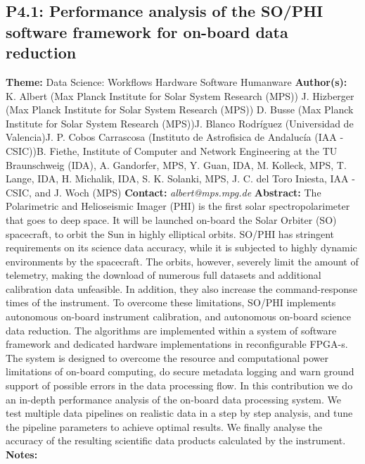 \documentclass{report}
\begin{document}
{{\subsection*{P4.1: Performance analysis of the SO/PHI software framework for on-board data reduction}
{\bf Theme:}  Data Science: Workflows Hardware Software Humanware\newline
{\bf Author(s):}\newline
K. Albert (Max Planck Institute for Solar System Research (MPS)) \newline J. Hizberger (Max Planck Institute for Solar System Research (MPS)) \newline  D. Busse (Max Planck Institute for Solar System Research (MPS))\newline  J. Blanco Rodríguez (Universidad de Valencia)\newline J. P. Cobos Carrascosa (Instituto de Astrofisica de Andalucía (IAA - CSIC))\newline  B. Fiethe, Institute of Computer and Network Engineering at the TU Braunschweig (IDA), A. Gandorfer, MPS, Y. Guan, IDA, M. Kolleck, MPS, T. Lange, IDA, H. Michalik, IDA, S. K. Solanki, MPS, J. C. del Toro Iniesta, IAA - CSIC, and J. Woch (MPS)\newline\newline
{\bf Contact:} {\it albert@mps.mpg.de}\newline
\newline\newline
{\bf Abstract:}\newline
The Polarimetric and Helioseismic Imager (PHI) is the first solar spectropolarimeter that goes to deep space. It will be launched on-board the Solar Orbiter (SO) spacecraft, to orbit the Sun in highly elliptical orbits. SO/PHI has stringent requirements on its science data accuracy, while it is subjected to highly dynamic environments by the spacecraft. The orbits, however, severely limit the amount of telemetry, making the download of numerous full datasets and additional calibration data unfeasible. In addition, they also increase the command-response times of the instrument.
To overcome these limitations, SO/PHI implements autonomous on-board instrument calibration, and autonomous on-board science data reduction. The algorithms are implemented within a system of software framework and dedicated hardware implementations in reconfigurable FPGA-s. The system is designed to overcome the resource and computational power limitations of on-board computing, do secure metadata logging and warn ground support of possible errors in the data processing flow.
In this contribution we do an in-depth performance analysis of the on-board data processing system. We test multiple data pipelines on realistic data in a step by step analysis, and tune the pipeline parameters to achieve optimal results. We finally analyse the accuracy of the resulting scientific data products calculated by the instrument.\newline
{\bf Notes:}\newline
{\newpage
}}}
\end{document}
